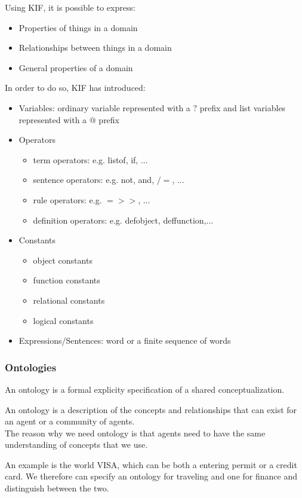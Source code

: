 Using KIF, it is possible to express:
\begin{itemize}
\item Properties of things in a domain
\item Relationships between things in a domain
\item General properties of a domain
\end{itemize}

In order to do so, KIF has introduced:
\begin{itemize}
\item Variables: ordinary variable represented with a $?$ prefix and list variables represented with a $@$ prefix
\item Operators
\begin{itemize}
\item term operators: e.g. listof, if, ...
\item sentence operators: e.g. not, and, $/=$, ...
\item rule operators: e.g. $=>>$, ...
\item definition operators: e.g. defobject, deffunction,...
\end{itemize}
\item Constants
\begin{itemize}
\item object constants
\item function constants
\item relational constants
\item logical constants
\end{itemize}
\item Expressions/Sentences: word or a finite sequence of words
\end{itemize}
\subsubsection{Ontologies}
An ontology is a formal explicity specification of a shared conceptualization.

An ontology is a description of the concepts and relationships that can exist for an agent or a community of agents. \\
The reason why we need ontology is that agents need to have the same understanding of concepts that we use.

An example is the world VISA, which can be both a entering permit or a credit card. We therefore can specify an ontology for traveling and one for finance and distinguish between the two.

